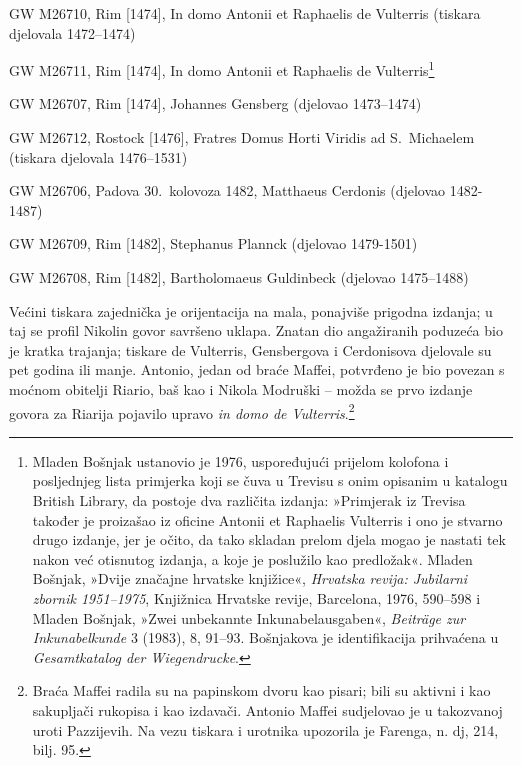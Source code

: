 \documentclass[a5paper,twoside]{article}
\begin{document}
\begin{description}[nolistsep,itemsep=3pt,font=\rmfamily]
\item[V\hphantom{e}] GW M26710, Rim [1474], In domo Antonii et Raphaelis de Vulterris (tiskara djelovala 1472–1474)
\item[V1] GW M26711, Rim [1474], In domo Antonii et Raphaelis de Vulterris\footnote{Mladen Bošnjak ustanovio je 1976, uspoređujući prijelom kolofona i posljednjeg lista primjerka koji se čuva u Trevisu s onim opisanim u katalogu British Library, da postoje dva različita izdanja: »Primjerak iz Trevisa također je proizašao iz oficine Antonii et Raphaelis Vulterris i ono je stvarno drugo izdanje, jer je očito, da tako skladan prelom djela mogao je nastati tek nakon već otisnutog izdanja, a koje je poslužilo kao predložak«. Mladen Bošnjak, »Dvije značajne hrvatske knjižice«, \textit{Hrvatska revija: Jubilarni zbornik 1951–1975}, Knjižnica Hrvatske revije, Barcelona, 1976, 590–598 i Mladen Bošnjak, »Zwei unbekannte Inkunabelausgaben«, \textit{Beiträge zur Inkunabelkunde} 3 (1983), 8, 91–93. Bošnjakova je identifikacija prihvaćena u \textit{Gesamtkatalog der Wiegendrucke}.}
\item[Ge] GW M26707, Rim [1474], Johannes Gensberg (djelovao 1473–1474)
\item[R\hphantom{o}] GW M26712, Rostock [1476], Fratres Domus Horti Viridis ad S.~Michaelem (tiskara djelovala 1476–1531)
\item[C\hphantom{d}] GW M26706, Padova 30.~kolovoza 1482, Matthaeus Cerdonis (djelovao 1482-1487)
\item[P\hphantom{d}] GW M26709, Rim [1482], Stephanus Plannck (djelovao 1479-1501)
\item[Gd] GW M26708, Rim [1482], Bartholomaeus Guldinbeck (djelovao 1475–1488)
\end{description}

Većini tiskara zajednička je orijentacija na mala, ponajviše prigodna izdanja; u taj se profil Nikolin govor savršeno uklapa. Znatan dio angažiranih poduzeća bio je kratka trajanja; tiskare de Vulterris, Gensbergova i Cerdonisova djelovale su pet godina ili manje. Antonio, jedan od braće Maffei, potvrđeno je bio povezan s moćnom obitelji Riario, baš kao i Nikola Modruški – možda se prvo izdanje govora za Riarija pojavilo upravo \textit{in domo de Vulterris}.\footnote{Braća Maffei radila su na papinskom dvoru kao pisari; bili su aktivni i kao sakupljači rukopisa i kao izdavači. Antonio Maffei sudjelovao je u takozvanoj uroti Pazzijevih. Na vezu tiskara i urotnika upozorila je Farenga, n. dj, 214, bilj. 95.}
\end{document}
